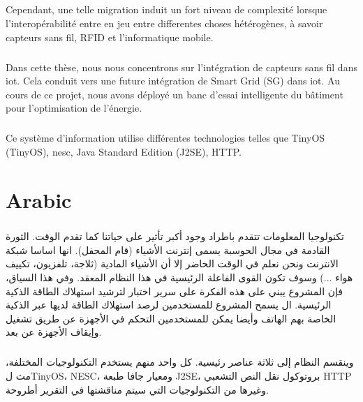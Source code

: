 \documentclass[oneside,12pt,a4paper,final]{book}
\begin{document}
\paragraph{}
Cependant, une telle migration induit un fort niveau de complexité lorsque l'interopérabilité entre en jeu entre differentes choses hétérogènes, à savoir capteurs sans fil, RFID et l'informatique mobile.
\paragraph{}
Dans cette thèse, nous nous concentrons sur l'intégration de capteurs sans fil dans \gls{iot}. Cela conduit vers une future intégration de Smart Grid (SG) dans \gls{iot}. Au cours de ce projet, nous avons déployé un banc d'essai intelligente du bâtiment pour l'optimisation de l'énergie.
\paragraph{}
Ce système d'information utilise différentes technologies  telles que TinyOS (TinyOS), \gls{nesc}, Java Standard Edition (J2SE), HTTP.




\chapter{Arabic}
\paragraph{}
\begin{arabtex}
تكنولوجيا المعلومات تتقدم باطراد وجود أكبر تأثير على حياتنا كما تقدم الوقت. الثورة القادمة في مجال الحوسبة يسمى إنترنت الأشياء (قام المحفل). انها اساسا شبكة الانترنت ونحن نعلم في الوقت الحاضر إلا أن الأشياء المادية (ثلاجة، تلفزيون، تكييف هواء ...) وسوف تكون القوى الفاعلة الرئيسية في هذا النظام المعقد. وفي هذا السياق، فإن المشروع يبني على هذه الفكرة على سرير اختبار لترشيد استهلاك الطاقة الذكية الرئيسية. ال يسمح المشروع للمستخدمين لرصد استهلاك الطاقة لديها عبر الذكية الخاصة بهم الهاتف وأيضا يمكن للمستخدمين التحكم في الأجهزة عن طريق تشغيل وإيقاف الأجهزة عن بعد.
\end{arabtex}
\paragraph{}
\begin{arabtex}
وينقسم النظام إلى ثلاثة عناصر رئيسية. كل واحد منهم يستخدم
التكنولوجيات المختلفة، مث لTinyOS، NESC، ومعيار جافا
طبعة J2SE، بروتوكول نقل النص التشعبي HTTP وغيرها من التكنولوجيات
التي سيتم مناقشتها في التقرير أطروحة.
\end{arabtex}
\end{document}
